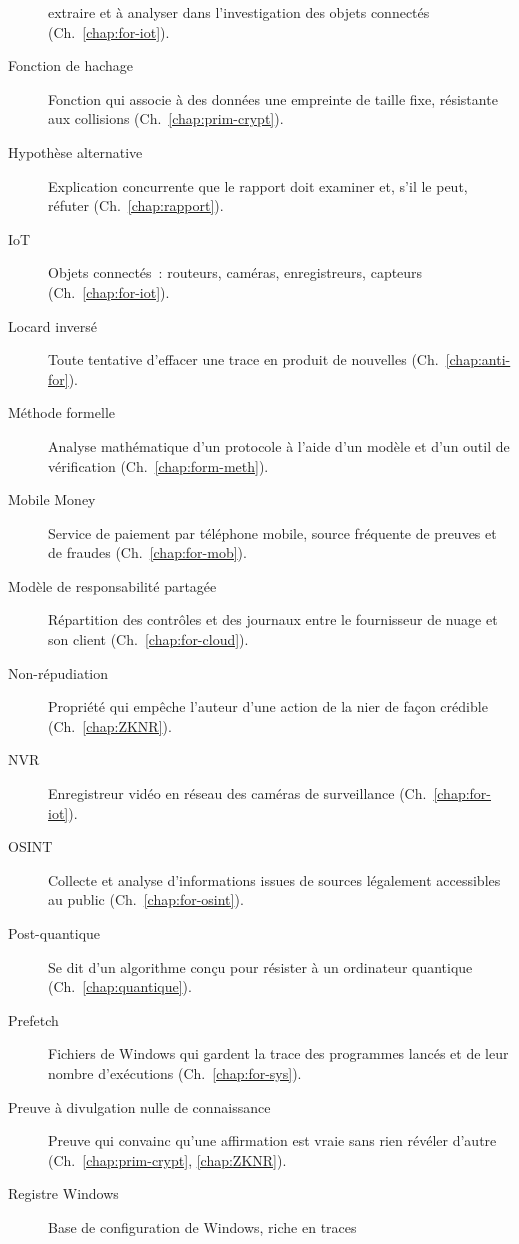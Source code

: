 \begin{description}
          extraire et à analyser dans l'investigation des objets connectés
          (Ch.~\ref{chap:for-iot}).
    \item[Fonction de hachage] Fonction qui associe à des données une empreinte
          de taille fixe, résistante aux collisions (Ch.~\ref{chap:prim-crypt}).
    \item[Hypothèse alternative] Explication concurrente que le rapport doit
          examiner et, s'il le peut, réfuter (Ch.~\ref{chap:rapport}).
    \item[IoT] Objets connectés~: routeurs, caméras, enregistreurs, capteurs
          (Ch.~\ref{chap:for-iot}).
    \item[Locard inversé] Toute tentative d'effacer une trace en produit de
          nouvelles (Ch.~\ref{chap:anti-for}).
    \item[Méthode formelle] Analyse mathématique d'un protocole à l'aide d'un
          modèle et d'un outil de vérification (Ch.~\ref{chap:form-meth}).
    \item[Mobile Money] Service de paiement par téléphone mobile, source
          fréquente de preuves et de fraudes (Ch.~\ref{chap:for-mob}).
    \item[Modèle de responsabilité partagée] Répartition des contrôles et des
          journaux entre le fournisseur de nuage et son client
          (Ch.~\ref{chap:for-cloud}).
    \item[Non-répudiation] Propriété qui empêche l'auteur d'une action de
          la nier de façon crédible (Ch.~\ref{chap:ZKNR}).
    \item[NVR] Enregistreur vidéo en réseau des caméras de surveillance
          (Ch.~\ref{chap:for-iot}).
    \item[OSINT] Collecte et analyse d'informations issues de sources
          légalement accessibles au public (Ch.~\ref{chap:for-osint}).
    \item[Post-quantique] Se dit d'un algorithme conçu pour résister à un
          ordinateur quantique (Ch.~\ref{chap:quantique}).
    \item[Prefetch] Fichiers de Windows qui gardent la trace des programmes
          lancés et de leur nombre d'exécutions (Ch.~\ref{chap:for-sys}).
    \item[Preuve à divulgation nulle de connaissance] Preuve qui convainc
          qu'une affirmation est vraie sans rien révéler d'autre
          (Ch.~\ref{chap:prim-crypt}, \ref{chap:ZKNR}).
    \item[Registre Windows] Base de configuration de Windows, riche en traces

\end{description}
